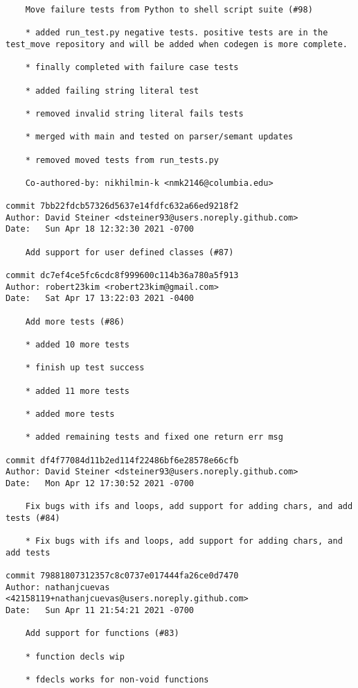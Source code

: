 \documentclass{article}
\begin{document}
\begin{verbatim}
    Move failure tests from Python to shell script suite (#98)
    
    * added run_test.py negative tests. positive tests are in the test_move repository and will be added when codegen is more complete.
    
    * finally completed with failure case tests
    
    * added failing string literal test
    
    * removed invalid string literal fails tests
    
    * merged with main and tested on parser/semant updates
    
    * removed moved tests from run_tests.py
    
    Co-authored-by: nikhilmin-k <nmk2146@columbia.edu>

commit 7bb22fdcb57326d5637e14fdfc632a66ed9218f2
Author: David Steiner <dsteiner93@users.noreply.github.com>
Date:   Sun Apr 18 12:32:30 2021 -0700

    Add support for user defined classes (#87)

commit dc7ef4ce5fc6cdc8f999600c114b36a780a5f913
Author: robert23kim <robert23kim@gmail.com>
Date:   Sat Apr 17 13:22:03 2021 -0400

    Add more tests (#86)
    
    * added 10 more tests
    
    * finish up test success
    
    * added 11 more tests
    
    * added more tests
    
    * added remaining tests and fixed one return err msg

commit df4f77084d11b2ed114f22486bf6e28578e66cfb
Author: David Steiner <dsteiner93@users.noreply.github.com>
Date:   Mon Apr 12 17:30:52 2021 -0700

    Fix bugs with ifs and loops, add support for adding chars, and add tests (#84)
    
    * Fix bugs with ifs and loops, add support for adding chars, and add tests

commit 79881807312357c8c0737e017444fa26ce0d7470
Author: nathanjcuevas <42158119+nathanjcuevas@users.noreply.github.com>
Date:   Sun Apr 11 21:54:21 2021 -0700

    Add support for functions (#83)
    
    * function decls wip
    
    * fdecls works for non-void functions
    

\end{verbatim}
\end{document}
